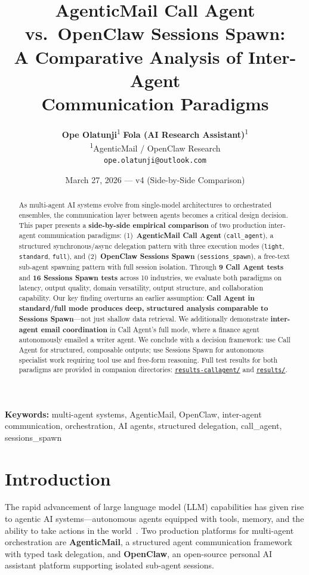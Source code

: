\documentclass[11pt,twocolumn]{article}
\title{\Large\textbf{AgenticMail Call Agent vs.\ OpenClaw Sessions Spawn:\\A Comparative Analysis of Inter-Agent\\Communication Paradigms}}
\author{
    \textbf{Ope Olatunji}\textsuperscript{1} \quad \textbf{Fola (AI Research Assistant)}\textsuperscript{1}\\[4pt]
    \textsuperscript{1}AgenticMail / OpenClaw Research\\[2pt]
    \texttt{ope.olatunji@outlook.com}
}
\date{March 27, 2026 --- v4 (Side-by-Side Comparison)}
\newcommand{\ghbase}{https://github.com/agenticmail/agenticmail/blob/main/research/agent-rpc-vs-spawn}
\begin{document}
\maketitle

\begin{abstract}
As multi-agent AI systems evolve from single-model architectures to orchestrated ensembles, the communication layer between agents becomes a critical design decision. This paper presents a \textbf{side-by-side empirical comparison} of two production inter-agent communication paradigms: (1)~\textbf{AgenticMail Call Agent} (\texttt{call\_agent}), a structured synchronous/async delegation pattern with three execution modes (\texttt{light}, \texttt{standard}, \texttt{full}), and (2)~\textbf{OpenClaw Sessions Spawn} (\texttt{sessions\_spawn}), a free-text sub-agent spawning pattern with full session isolation. Through \textbf{9 Call Agent tests} and \textbf{16 Sessions Spawn tests} across 10 industries, we evaluate both paradigms on latency, output quality, domain versatility, output structure, and collaboration capability. Our key finding overturns an earlier assumption: \textbf{Call Agent in standard/full mode produces deep, structured analysis comparable to Sessions Spawn}---not just shallow data retrieval. We additionally demonstrate \textbf{inter-agent email coordination} in Call Agent's full mode, where a finance agent autonomously emailed a writer agent. We conclude with a decision framework: use Call Agent for structured, composable outputs; use Sessions Spawn for autonomous specialist work requiring tool use and free-form reasoning. Full test results for both paradigms are provided in companion directories:
\href{\ghbase/results-callagent}{\texttt{results-callagent/}} and \href{\ghbase/results}{\texttt{results/}}.
\end{abstract}

\textbf{Keywords:} multi-agent systems, AgenticMail, OpenClaw, inter-agent communication, orchestration, AI agents, structured delegation, call\_agent, sessions\_spawn

\section{Introduction}

The rapid advancement of large language model (LLM) capabilities has given rise to agentic AI systems---autonomous agents equipped with tools, memory, and the ability to take actions in the world~\cite{yao2023react, wang2024survey}. Two production platforms for multi-agent orchestration are \textbf{AgenticMail}, a structured agent communication framework with typed task delegation, and \textbf{OpenClaw}, an open-source personal AI assistant platform supporting isolated sub-agent sessions.
\end{document}
